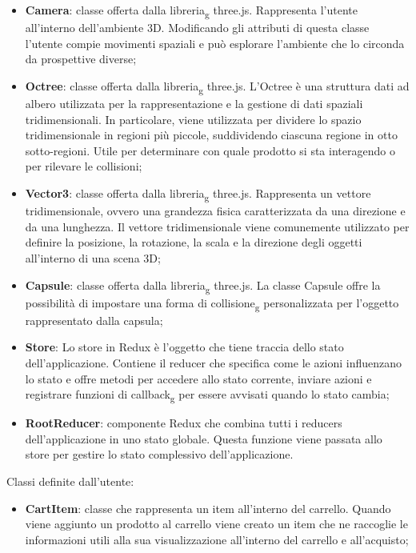 \begin{itemize}
\begin{itemize}
			\item \textbf{Camera}: classe offerta dalla libreria\textsubscript{g} three.js.
			Rappresenta l'utente all'interno dell'ambiente 3D.
			Modificando gli attributi di questa classe l'utente compie movimenti spaziali e può esplorare l'ambiente che 
			lo circonda da prospettive diverse;
			\item \textbf{Octree}: classe offerta dalla libreria\textsubscript{g} three.js.
			L'Octree è una struttura dati ad albero utilizzata per la rappresentazione e la gestione di dati spaziali 
			tridimensionali. 
			In particolare, viene utilizzata per dividere lo spazio tridimensionale in regioni più piccole, 
			suddividendo ciascuna regione in otto sotto-regioni.
			Utile per determinare con quale prodotto si sta interagendo o per rilevare le collisioni;
			\item \textbf{Vector3}: classe offerta dalla libreria\textsubscript{g} three.js.
			Rappresenta un vettore tridimensionale, ovvero una grandezza fisica caratterizzata da una direzione e da una lunghezza.
			Il vettore tridimensionale viene comunemente utilizzato per definire la posizione, la rotazione, 
			la scala e la direzione degli oggetti all'interno di una scena 3D;
			\item \textbf{Capsule}: classe offerta dalla libreria\textsubscript{g} three.js.
			La classe Capsule offre la possibilità di impostare una forma di collisione\textsubscript{g} personalizzata 
			per l'oggetto rappresentato dalla capsula; 
			\item \textbf{Store}: Lo store in Redux è l'oggetto che tiene traccia dello stato dell'applicazione. 
			Contiene il reducer che specifica come le azioni influenzano lo stato e offre metodi per accedere allo stato corrente, 
			inviare azioni e registrare funzioni di callback\textsubscript{g} per essere avvisati quando lo stato cambia;
			\item \textbf{RootReducer}: componente Redux che combina tutti i reducers dell'applicazione in uno stato globale. 
			Questa funzione viene passata allo store per gestire lo stato complessivo dell'applicazione.
		\end{itemize}
		Classi definite dall'utente:
		\begin{itemize}
			\item \textbf{CartItem}: classe che rappresenta un item all'interno del carrello.
			Quando viene aggiunto un prodotto al carrello viene creato un item che ne raccoglie le informazioni utili 
			alla sua visualizzazione all'interno del carrello e all'acquisto;

\end{itemize}
\end{itemize}
